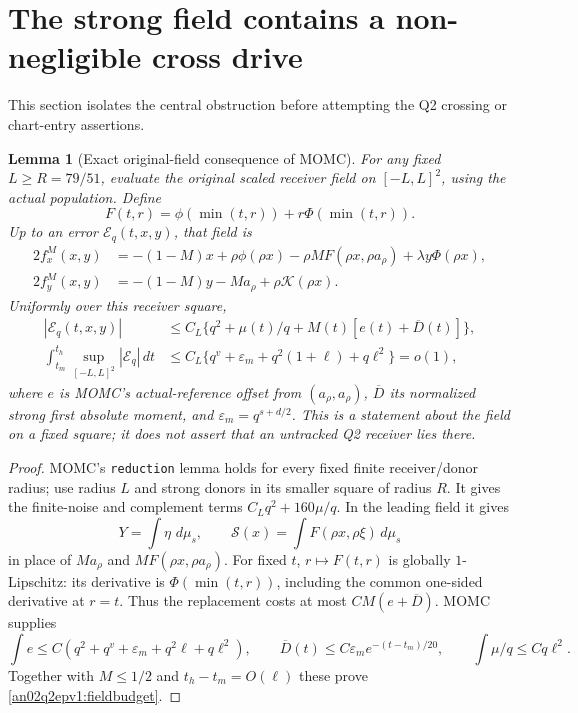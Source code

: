 \documentclass[11pt]{article}
\newtheorem{lemma}[theorem]{Lemma}
\theoremstyle{remark}\newtheorem{remark}[theorem]{Remark}
\newcommand{\dd}{\,d}
\newcommand{\eps}{\varepsilon}
\begin{document}
\section{The strong field contains a non-negligible cross drive}
This section isolates the central obstruction before attempting
the Q2 crossing or chart-entry assertions.

\begin{lemma}[Exact original-field consequence of MOMC]
\label{an02q2epv1:field}
For any fixed $L\ge R=79/51$, evaluate the original scaled
receiver field on $[-L,L]^2$, using the actual population.
Define
\[
 F(t,r)=\phi(\min(t,r))+r\Phi(\min(t,r)).
\]
Up to an error $\mathcal E_q(t,x,y)$, that field is
\begin{align}
 2f_x^M(x,y)&=-(1-M)x+\rho\phi(\rho x)
       -\rho M F(\rho x,\rho a_\rho)+\lambda y\Phi(\rho x),
       \nonumber\\
 2f_y^M(x,y)&=-(1-M)y-Ma_\rho+\rho\mathcal K(\rho x).
 \label{an02q2epv1:coherentfield}
\end{align}
Uniformly over this receiver square,
\begin{align}
 |\mathcal E_q(t,x,y)|
 &\le C_L\{q^2+\mu(t)/q+M(t)[e(t)+\overline D(t)]\},\nonumber\\
 \int_{t_m}^{t_h}\sup_{[-L,L]^2}|\mathcal E_q|\dd t
 &\le C_L\{q^v+\eps_m+q^2(1+\ell)+q\ell^2\}=o(1),
 \label{an02q2epv1:fieldbudget}
\end{align}
where $e$ is MOMC's actual-reference offset from $(a_\rho,a_\rho)$,
$\overline D$ its normalized strong first absolute moment, and
$\eps_m=q^{s+d/2}$. This is a statement about the field on a fixed
square; it does not assert that an untracked Q2 receiver lies there.
\end{lemma}
\begin{proof}
MOMC's \texttt{reduction} lemma holds for every fixed finite
receiver/donor radius; use radius $L$ and strong donors in its
smaller square of radius $R$. It gives the finite-noise and
complement terms $C_Lq^2+160\mu/q$. In the leading field it gives
\[
 Y=\int\eta\,\dd\mu_s,\qquad
 \mathcal S(x)=\int F(\rho x,\rho\xi)\dd\mu_s
\]
in place of $Ma_\rho$ and $M F(\rho x,\rho a_\rho)$.
For fixed $t$, $r\mapsto F(t,r)$ is globally $1$-Lipschitz:
its derivative is $\Phi(\min(t,r))$, including the common
one-sided derivative at $r=t$.
Thus the replacement costs at most $C M(e+\overline D)$.
MOMC supplies
\[
 \int e\le C(q^2+q^v+\eps_m+q^2\ell+q\ell^2),\qquad
 \overline D(t)\le C\eps_m e^{-(t-t_m)/20},\qquad
 \int\mu/q\le Cq\ell^2 .
\]
Together with $M\le1/2$ and $t_h-t_m=O(\ell)$ these prove
\eqref{an02q2epv1:fieldbudget}.
\end{proof}
\end{document}
